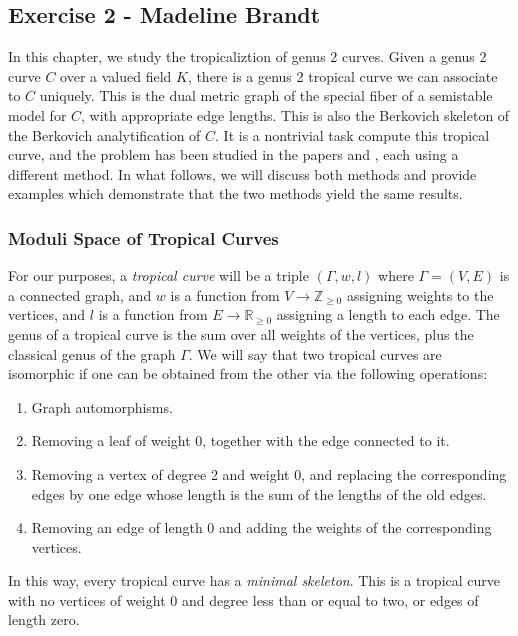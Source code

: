 

\subsection{Exercise 2 - Madeline Brandt}
 
In this chapter, we study the tropicaliztion of genus 2 curves. Given a genus 2 curve $C$ over a valued field $K$, there is a genus 2 tropical curve we can associate to $C$ uniquely. This is the dual metric graph of the special fiber of a semistable model for $C$, with appropriate edge lengths. This is also the Berkovich skeleton of the Berkovich analytification of $C$.
It is a nontrivial task compute this tropical curve, and the problem has been studied in the papers \cite{masters} and \cite{section5}, each using a different method. In what follows, we will discuss both methods and provide examples which demonstrate that the two methods yield the same results.


\subsubsection{Moduli Space of Tropical Curves}

For our purposes, a \emph{tropical curve} will be a triple $(\Gamma, w, l)$ where $\Gamma = (V,E)$ is a connected graph, and $w$ is a function from $V\rightarrow \mathbb{Z}_{\geq 0}$ assigning weights to the vertices, and $l$ is a function from $E \rightarrow \mathbb{R}_{\geq 0}$ assigning a length to each edge. The genus of a tropical curve is the sum over all weights of the vertices, plus the classical genus of the graph $\Gamma$. We will say that two tropical curves are isomorphic if one can be obtained from the other via the following operations:
\begin{enumerate}
\item Graph automorphisms.
\item Removing a leaf of weight 0, together with the edge connected to it.
\item Removing a vertex of degree 2 and weight 0, and replacing the corresponding edges by one edge whose length is the sum of the lengths of the old edges.
\item Removing an edge of length 0 and adding the weights of the corresponding vertices.
\end{enumerate}
In this way, every tropical curve has a \emph{minimal skeleton}. This is a tropical curve with no vertices of weight 0 and degree less than or equal to two, or edges of length zero.

